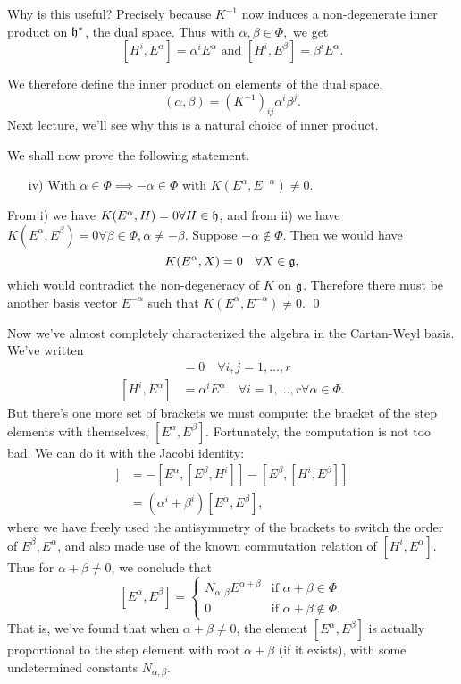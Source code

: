 Why is this useful? Precisely because $K^{-1}$ now induces a non-degenerate inner product on $\mathfrak{h}^*$, the dual space. Thus with $\alpha,\beta\in \Phi,$ we get
$$[H^i,E^\alpha]=\alpha^i E^\alpha\text{ and }[H^i,E^\beta]=\beta^i E^\alpha.$$
\begin{defn}
We therefore define the inner product on elements of the dual space,
$$(\alpha,\beta)=(K^{-1})_{ij}\alpha^i \beta^j.$$
Next lecture, we'll see why this is a natural choice of inner product.
\end{defn}

We shall now prove the following statement.
\begin{itemize}
\item[iv)] With $\alpha\in \Phi\implies -\alpha\in \Phi$ with
$K(E^\alpha,E^{-\alpha})\neq 0.$
\end{itemize}
From i) we have $K(E^\alpha,H)=0\forall H\in \mathfrak{h}$, and from ii) we have $K(E^\alpha,E^\beta)=0 \forall \beta\in \Phi, \alpha\neq -\beta$. Suppose $-\alpha \notin \Phi$. Then we would have
$$K(E^\alpha,X)=0\quad \forall X\in \mathfrak{g},$$
which would contradict the non-degeneracy of $K$ on $\mathfrak{g}$. Therefore there must be another basis vector $E^{-\alpha}$ such that $K(E^\alpha,E^{-\alpha})\neq 0$. \qed

Now we've almost completely characterized the algebra in the Cartan-Weyl basis. We've written
\begin{align*}
[H^i,H^j]&=0 \quad\forall i,j=1,\ldots,r\\{}
[H^i,E^\alpha]&= \alpha^i E^\alpha \quad\forall i=1,\ldots,r \forall \alpha \in \Phi.
\end{align*}
But there's one more set of brackets we must compute: the bracket of the step elements with themselves, $[E^\alpha,E^\beta]$. Fortunately, the computation is not too bad. We can do it with the Jacobi identity:
\begin{align*}
[H^i,[E^\alpha,E^\beta]]&=-[E^\alpha,[E^\beta,H^i]]-[E^\beta,[H^i,E^\beta]]\\
&=(\alpha^i+\beta^i)[E^\alpha,E^\beta],
\end{align*}
where we have freely used the antisymmetry of the brackets to switch the order of $E^\beta,E^\alpha$, and also made use of the known commutation relation of $[H^i,E^\alpha]$. Thus for $\alpha+\beta \neq 0$, we conclude that
$$[E^\alpha,E^\beta]=\begin{cases}
N_{\alpha,\beta}E^{\alpha+\beta} & \text{if }\alpha+\beta\in \Phi\\
0 & \text{if }\alpha+\beta\not\in \Phi.
\end{cases}
$$
That is, we've found that when $\alpha+\beta\neq 0$, the element $[E^\alpha,E^\beta]$ is actually proportional to the step element with root $\alpha+\beta$ (if it exists), with some undetermined constants $N_{\alpha,\beta}.$